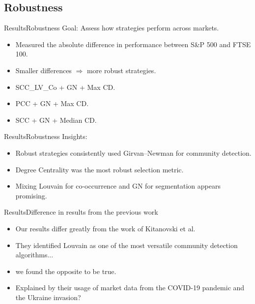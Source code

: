 \documentclass[bigger]{beamer}
\begin{document}
\subsection{Robustness}

\begin{frame}{Results}{Robustness}
    Goal: Assess how strategies perform across markets.
    \begin{itemize}
        \item<2-> Measured the absolute difference in performance between S\&P 500 and FTSE 100.
        \item<3-> Smaller differences $\Rightarrow$ more robust strategies.
    \end{itemize}
    \begin{itemize}
        \item<5-> SCC\_LV\_Co + GN + Max CD.
        \item<6-> PCC + GN + Max CD.
        \item<7-> SCC + GN + Median CD.
    \end{itemize}
\end{frame}

\begin{frame}{Results}{Robustness}
    Insights:
    \begin{itemize}
        \item<2-> Robust strategies consistently used Girvan–Newman for community detection.
        \item<3-> Degree Centrality was the most robust selection metric.
        \item<4-> Mixing Louvain for co-occurrence and GN for segmentation appears promising.
    \end{itemize}
\end{frame}

\begin{frame}{Results}{Difference in results from the previous work}
    \begin{itemize}
        \item<2-> Our results differ greatly from the work of Kitanovski et al.
        \item<3-> They identified Louvain as one of the most versatile community detection algorithms...
        \item<4-> we found the opposite to be true.
        \item<5-> Explained by their usage of market data from the COVID-19 pandemic and the Ukraine invasion?
    \end{itemize}
\end{frame}
\end{document}
